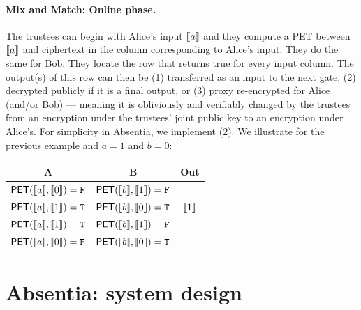 \paragraph{Mix and Match: Online phase.} The trustees can begin with Alice's input $\llbracket a \rrbracket$ and they compute a PET between $\llbracket a \rrbracket$ and ciphertext in the column corresponding to Alice's input. They do the same for Bob. They locate the row that returns true for every input column. The output(s) of this row can then be (1) transferred as an input to the next gate, (2) decrypted publicly if it is a final output, or (3) proxy re-encrypted for Alice (and/or Bob) --- meaning it is obliviously and verifiably changed by the trustees from an encryption under the trustees' joint public key to an encryption under Alice's. For simplicity in Absentia, we implement (2). We illustrate for the previous example and $a=1$ and $b=0$:

\begin{center}
\begin{tabular}{|c|c|c|}
  \hline
  A			& 	B			& 	Out   			\\ \hline
  $\mathsf{PET}(\llbracket a \rrbracket,\llbracket 0 \rrbracket) = \mathtt{F}$ 	&	$\mathsf{PET}(\llbracket b \rrbracket,\llbracket 1 \rrbracket) = \mathtt{F}$ 	& 	 		\\ \hline
  $\mathsf{PET}(\llbracket a \rrbracket,\llbracket 1 \rrbracket) = \mathtt{T}$ 	&	$\mathsf{PET}(\llbracket b \rrbracket,\llbracket 0 \rrbracket) = \mathtt{T}$ 	&  $\llbracket 1 \rrbracket$  	\\ \hline
  $\mathsf{PET}(\llbracket a \rrbracket,\llbracket 1 \rrbracket) = \mathtt{T}$ 	&	$\mathsf{PET}(\llbracket b \rrbracket,\llbracket 1 \rrbracket) = \mathtt{F}$ 	&  	 		\\ \hline
  $\mathsf{PET}(\llbracket a \rrbracket,\llbracket 0 \rrbracket) = \mathtt{F}$ 	&	$\mathsf{PET}(\llbracket b \rrbracket,\llbracket 0 \rrbracket) = \mathtt{T}$ 	& 	 		\\ \hline
\end{tabular}
\end{center}

\section{Absentia: system design}
\label{sec:system}

